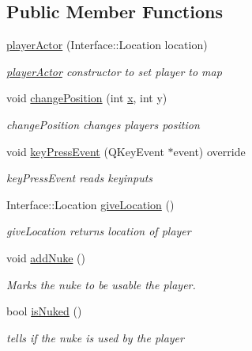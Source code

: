 \subsection*{Public Member Functions}
\begin{DoxyCompactItemize}
\item 
\hyperlink{class_student_side_1_1player_actor_a58a39690b97b3442cd7e01a3fae5b8bb}{player\-Actor} (Interface\-::\-Location location)
\begin{DoxyCompactList}\small\item\em \hyperlink{class_student_side_1_1player_actor}{player\-Actor} constructor to set player to map \end{DoxyCompactList}\item 
void \hyperlink{class_student_side_1_1player_actor_a6f2221903208ea8475f4c27efa76e842}{change\-Position} (int \hyperlink{jquery_8js_a4c3eadaa5164016d2c340d495fc6e55e}{x}, int y)
\begin{DoxyCompactList}\small\item\em change\-Position changes players position \end{DoxyCompactList}\item 
void \hyperlink{class_student_side_1_1player_actor_a9feca7b2dd13c5a8febc7c54aac8940e}{key\-Press\-Event} (Q\-Key\-Event $\ast$event) override
\begin{DoxyCompactList}\small\item\em key\-Press\-Event reads keyinputs \end{DoxyCompactList}\item 
Interface\-::\-Location \hyperlink{class_student_side_1_1player_actor_a551fd8c11c43a9ebb0401ed0ee9ef63c}{give\-Location} ()
\begin{DoxyCompactList}\small\item\em give\-Location returns location of player \end{DoxyCompactList}\item 
void \hyperlink{class_student_side_1_1player_actor_a2d1a691ca176eb1436febd320d2040ab}{add\-Nuke} ()
\begin{DoxyCompactList}\small\item\em Marks the nuke to be usable the player. \end{DoxyCompactList}\item 
bool \hyperlink{class_student_side_1_1player_actor_a54888fe10ceb2fdcd7b99e7f5c227da9}{is\-Nuked} ()
\begin{DoxyCompactList}\small\item\em tells if the nuke is used by the player \end{DoxyCompactList}\end{DoxyCompactItemize}


